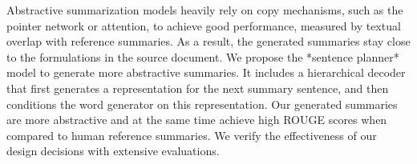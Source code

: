 Abstractive summarization models heavily rely on copy mechanisms, such as the pointer network or attention, to achieve good performance, measured by textual overlap with reference summaries. As a result, the generated summaries stay close to the formulations in the source document. We propose the *sentence planner* model to generate more abstractive summaries. It includes a hierarchical decoder that first generates a representation for the next summary sentence, and then conditions the word generator on this representation. Our generated summaries are more abstractive and at the same time achieve high ROUGE scores when compared to human reference summaries. We verify the effectiveness of our design decisions with extensive evaluations.
